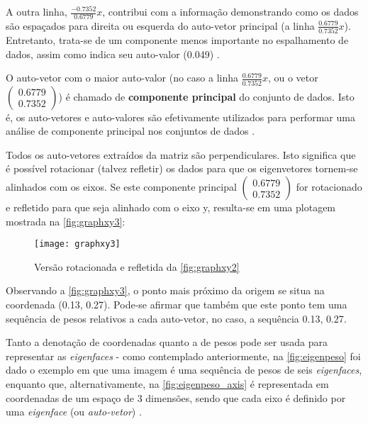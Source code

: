 A outra linha, $\frac{-0.7352}{0.6779}$$x$, contribui com a informação demonstrando como os dados são espaçados para direita ou esquerda do auto-vetor principal (a linha $\frac{0.6779}{0.7352}$$x$). Entretanto, trata-se de um componente menos importante no espalhamento de dados, assim como indica seu auto-valor (0.049) \cite{drmathew_java_programming}.

O auto-vetor com o maior auto-valor (no caso a linha $\frac{0.6779}{0.7352}$$x$, ou o vetor $\begin{pmatrix} 0.6779 \\ 0.7352 \end{pmatrix}$) é chamado de \textbf{componente principal} do conjunto de dados. Isto é, os auto-vetores e auto-valores são efetivamente utilizados para performar uma análise de componente principal nos conjuntos de dados \cite{drmathew_java_programming}.

Todos os auto-vetores extraídos da matriz são perpendiculares. Isto significa que é possível rotacionar (talvez refletir) os dados para que os eigenvetores tornem-se alinhados com os eixos. Se este componente principal $\begin{pmatrix} 0.6779 \\ 0.7352 \end{pmatrix}$ for rotacionado e refletido para que seja alinhado com o eixo y, resulta-se em uma plotagem mostrada na \autoref{fig:graphxy3}:

\begin{figure}[h]
	\centering
	\texttt{[image: graphxy3]}
	\caption{Versão rotacionada e refletida da \autoref{fig:graphxy2}}
	\label{fig:graphxy3}
\end{figure}

Observando a \autoref{fig:graphxy3}, o ponto mais próximo da origem se situa na coordenada (0.13, 0.27). Pode-se afirmar que também que este ponto tem uma sequência de pesos relativos a cada auto-vetor, no caso, a sequência {0.13, 0.27}.

Tanto a denotação de coordenadas quanto a de pesos pode ser usada para representar as \textit{eigenfaces} - como contemplado anteriormente, na \autoref{fig:eigenpeso} foi dado o exemplo em que uma imagem é uma sequência de pesos de seis \textit{eigenfaces}, enquanto que, alternativamente, na  \autoref{fig:eigenpeso_axis} é representada em coordenadas de um espaço de 3 dimensões, sendo que cada eixo é definido por uma \textit{eigenface} (ou \textit{auto-vetor}) \cite{drmathew_java_programming}.



